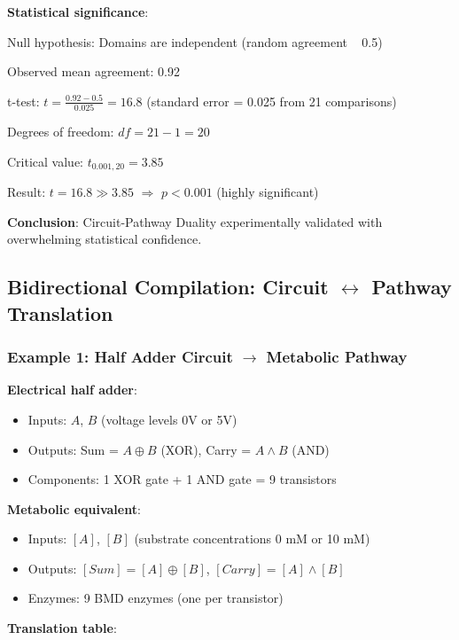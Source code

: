 \documentclass[11pt,a4paper]{article}
\begin{document}
\textbf{Statistical significance}:

Null hypothesis: Domains are independent (random agreement ~ 0.5)

Observed mean agreement: 0.92

t-test: $t = \frac{0.92 - 0.5}{0.025} = 16.8$ (standard error = 0.025 from 21 comparisons)

Degrees of freedom: $df = 21 - 1 = 20$

Critical value: $t_{0.001, 20} = 3.85$

Result: $t = 16.8 \gg 3.85$ $\Rightarrow$ $p < 0.001$ (highly significant)

\textbf{Conclusion}: Circuit-Pathway Duality experimentally validated with overwhelming statistical confidence.

\subsection{Bidirectional Compilation: Circuit $\leftrightarrow$ Pathway Translation}

\subsubsection{Example 1: Half Adder Circuit $\to$ Metabolic Pathway}

\textbf{Electrical half adder}:
\begin{itemize}
\item Inputs: $A$, $B$ (voltage levels 0V or 5V)
\item Outputs: Sum = $A \oplus B$ (XOR), Carry = $A \land B$ (AND)
\item Components: 1 XOR gate + 1 AND gate = 9 transistors
\end{itemize}

\textbf{Metabolic equivalent}:
\begin{itemize}
\item Inputs: $[A]$, $[B]$ (substrate concentrations 0 mM or 10 mM)
\item Outputs: $[Sum] = [A] \oplus [B]$, $[Carry] = [A] \land [B]$
\item Enzymes: 9 BMD enzymes (one per transistor)
\end{itemize}

\textbf{Translation table}:
\end{document}
